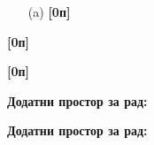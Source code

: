 \documentclass[10pt, a4paper, twoside]{article}
\begin{document}
\newpage


\noindent
{}
\begin{minipage}[t]{0.93\textwidth}
\begin{enumerate}
\itemsep0pt
\item[(a)] \textbf{[0п]}

\end{enumerate}
\end{minipage}


\newpage

\noindent
\begin{minipage}[t]{0.6\linewidth}
\noindent
{} \textbf{[0п]} 
\end{minipage}
\begin{minipage}[t]{0.4\linewidth}
\begin{flushright}
	\vspace{-10pt}
\end{flushright}
\end{minipage}

\vfill

\newpage

\noindent
\begin{minipage}[t]{0.7\linewidth}
\noindent
{} \textbf{[0п]}
\end{minipage}
\begin{minipage}[t]{0.3\linewidth}
\begin{flushright}
	\vspace*{0pt}
\end{flushright}
\end{minipage}



\newpage

\textbf{Додатни простор за рад:}

\newpage

\textbf{Додатни простор за рад:}
\end{document}
